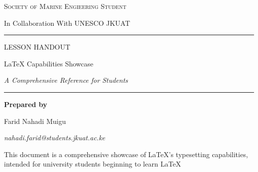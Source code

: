 \documentclass[12pt, a4paper]{article}
\theoremstyle{definition}
\theoremstyle{plain}
\theoremstyle{remark}
\begin{document}
\begin{titlepage}
  \thispagestyle{empty}
  \centering
  \vspace*{2.5cm}

  {\large\scshape Society of Marine Engieering Student\par}
  \vspace{0.3cm}
  {\normalsize In Collaboration With UNESCO JKUAT\par}
  \vspace{1.2cm}

  \noindent\rule{\linewidth}{0.8pt}
  \vspace{0.5cm}

  {\small \MakeUppercase{Lesson Handout}\par}
  \vspace{0.4cm}

  {\Huge \LaTeX{} Capabilities Showcase\par}
  \vspace{0.3cm}

  {\large\itshape A Comprehensive Reference for Students\par}
  \vspace{0.5cm}

  \noindent\rule{\linewidth}{0.8pt}
  \vspace{1.5cm}

  {\normalsize\textbf{Prepared by}\par}
  \vspace{0.3cm}
  {\large Farid Nahadi Muigu\par}
  {\normalsize\itshape nahadi.farid@students.jkuat.ac.ke\par}
  \vspace{1.5cm}


  \vfill

  \small This document is a comprehensive showcase of \LaTeX{}'s typesetting capabilities, intended for university students beginning to learn \LaTeX{}

\end{titlepage}

\tableofcontents
\listoffigures                  %
\listoftables                   %
\lstlistoflistings              %

\newpage                        %
\end{document}
